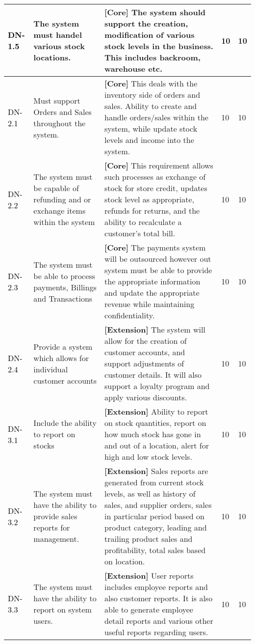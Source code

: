 \documentclass[a4paper]{article}
\begin{document}
\begin{longtable}{|l|p{5cm}|p{7cm}|p{0.5cm}|p{0.5cm}|}
    \textcolor{black}{DN-1.5} & The system must handel various stock locations. & \textbf{[Core] }The system should support the creation, modification of various stock levels in the business. This includes backroom, warehouse etc.& 10 & 10\\
  \hline
  \textcolor{black}{DN-2.1} &  Must support Orders and Sales throughout the system. & \textbf{[Core] }This deals with the inventory side of orders and sales. Ability to create and handle orders/sales within the system, while update stock levels and income into the system.& 10 & 10\\
  \textcolor{black}{DN-2.2} &  The system must be capable of refunding and or exchange items within the system & \textbf{[Core] }This requirement allows such processes as exchange of stock for store credit, updates stock level as appropriate, refunds for returns, and the ability to recalculate a customer's total bill.& 10 & 10\\
  \textcolor{black}{DN-2.3} & The system must be able to process payments, Billings and Transactions & \textbf{[Core] }The payments system will be outsourced however out system must be able to provide the appropriate information and update the appropriate revenue while maintaining confidentiality.& 10 & 10\\
  \textcolor{black}{DN-2.4} & Provide a system which allows for individual customer accounts & \textbf{[Extension] }The system will allow for the creation of customer accounts, and support adjustments of customer details. It will also support a loyalty program and apply various discounts.& 10 & 10\\
  \hline
  \textcolor{black}{DN-3.1} &  Include the ability to report on stocks & \textbf{[Extension] }Ability to report on stock quantities, report on how much stock has gone in and out of a location, alert for high and low stock levels.& 10 & 10\\
  \textcolor{black}{DN-3.2} & The system must have the ability to provide sales reports for management. & \textbf{[Extension] }Sales reports are generated from current stock levels, as well as history of sales, and supplier orders, sales in particular period based on product category,
leading and trailing product sales and profitability, total sales based on location. & 10 & 10\\
\textcolor{black}{DN-3.3} & The system must have the ability to report on system users. & \textbf{[Extension] }User reports includes employee reports and also customer reports. It is also able to generate employee detail reports and various other useful reports regarding users.& 10 & 10\\

\end{longtable}
\end{document}
